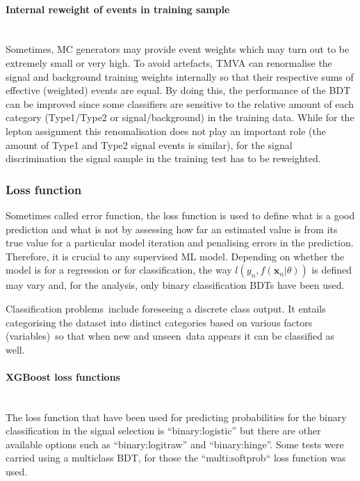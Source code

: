 \paragraph{Internal reweight of events in training sample}\mbox{}\\
Sometimes, MC generators may provide event weights which may turn out to be extremely small or very high. To avoid
artefacts, TMVA can renormalise the signal and background training weights internally so that their respective sums of 
effective (weighted) events are equal. By doing this, the performance of the BDT can be improved since some 
classifiers are sensitive to the relative amount of each category (Type1/Type2 or signal/background) in the training data.
While for the lepton assignment this renomalisation does not play an important role (the amount of Type1 and Type2 
signal events is similar), for the \tHq signal discrimination the signal sample in the training test has to be reweighted.

\subsubsection{Loss function}
Sometimes called error function, the loss function is used to define what is a good prediction and what is not by
assessing how far an estimated value is from its true value for a particular model iteration and penalising errors in
the prediction.
Therefore, it is crucial to any supervised ML model.
Depending on whether the model is for a regression or for classification, 
the way $ l(y_{n}, f(\bm{x}_{n}|\theta))$ is defined may vary and, for the analysis,
only binary classification BDTs have been used. 

Classification problems include foreseeing a discrete class output. 
It entails categorising the dataset into distinct categories based on 
various factors (variables) so that when new and unseen data appears 
it can be classified as well. 

\paragraph{XGBoost loss functions}\mbox{}\\ %
The loss function that have been used for predicting probabilities for the binary classification 
in the signal selection is “binary:logistic” but there are other available options such as
 “binary:logitraw” and “binary:hinge”. Some tests were carried using a multiclass BDT, for those
 the “multi:softprob“ loss function was used. 
 
